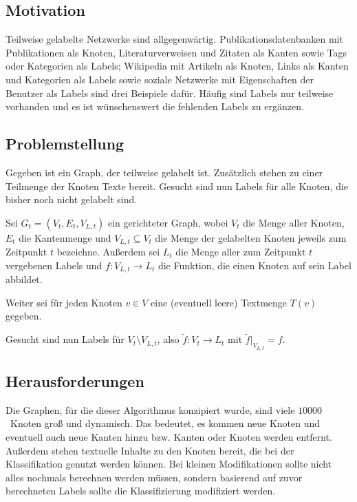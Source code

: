 \subsection{Motivation}
Teilweise gelabelte Netzwerke sind allgegenwärtig. Publikationsdatenbanken
mit Publikationen als Knoten, Literaturverweisen und Zitaten als Kanten
sowie Tags oder Kategorien als Labels;
Wikipedia mit Artikeln als Knoten, Links als Kanten und Kategorien
als Labels sowie soziale Netzwerke mit Eigenschaften der Benutzer
als Labels sind drei Beispiele dafür.
Häufig sind Labels nur teilweise vorhanden und es ist wünschenswert die 
fehlenden Labels zu ergänzen. 

\subsection{Problemstellung}
Gegeben ist ein Graph, der teilweise gelabelt ist. Zusätzlich stehen
zu einer Teilmenge der Knoten Texte bereit. Gesucht sind nun Labels
für alle Knoten, die bisher noch nicht gelabelt sind.\\

\begin{definition}[Knotenklassifierungsproblem]\label{def:Knotenklassifizierungsproblem}
    Sei $G_t = (V_t, E_t, V_{L,t})$ ein gerichteter Graph,
    wobei $V_t$ die Menge aller Knoten,
    $E_t$ die Kantenmenge und $V_{L,t} \subseteq V_t$ die Menge der 
    gelabelten Knoten jeweils zum Zeitpunkt $t$ bezeichne.
    Außerdem sei $L_t$ die Menge aller zum Zeitpunkt $t$ vergebenen
    Labels und $f:V_{L,t} \rightarrow L_t$ die Funktion, die einen
    Knoten auf sein Label abbildet.

    Weiter sei für jeden Knoten $v \in V$ eine (eventuell leere)
    Textmenge $T(v)$ gegeben.

    Gesucht sind nun Labels für $V_t \setminus V_{L,t}$, also
    $\tilde{f}: V_t \rightarrow L_t$ mit 
    $\tilde{f}|_{V_{L,t}} = f$.
\end{definition}

\subsection{Herausforderungen}
Die Graphen, für die dieser Algorithmus konzipiert wurde,
sind viele $\num{10000}$~Knoten groß und dynamisch. Das bedeutet, es 
kommen neue Knoten und eventuell auch neue Kanten hinzu bzw. Kanten 
oder Knoten werden entfernt. Außerdem stehen textuelle Inhalte zu den 
Knoten bereit, die bei der Klassifikation genutzt werden können.
Bei kleinen Modifikationen sollte nicht alles nochmals berechnen 
werden müssen, sondern basierend auf zuvor
berechneten Labels sollte die Klassifizierung modifiziert werden.
